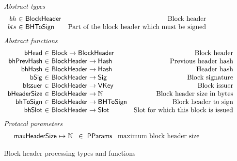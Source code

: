\documentclass[11pt,a4paper]{article}
\newcommand{\fun}[1]{\mathsf{#1}}
\newcommand{\type}[1]{\mathsf{#1}}
\newcommand{\totalf}{\to}
\newcommand{\partialf}{\mapsto}
\newcommand{\Hash}{\type{Hash}}  %
\newcommand{\Slot}{\type{Slot}}
\newcommand{\Block}{\type{Block}}
\newcommand{\VKey}{\type{VKey}}
\newcommand{\Sig}{\type{Sig}}
\newcommand{\ProtParams}{\type{PParams}} %
\newcommand{\bhdrsizename}{bHeaderSize}
\newcommand{\bsigname}{bSig}
\newcommand{\bissuername}{bIssuer}
\begin{document}
\begin{figure}[ht]
  \emph{Abstract types}
  \begin{equation*}
    \begin{array}{r@{~\in~}lr}
      bh & \Bhead & \text{Block header} \\
      bts & \Bhtosign & \text{Part of the block header which must be signed}
    \end{array}
  \end{equation*}
  \emph{Abstract functions}
  \begin{equation*}
    \begin{array}{r@{~\in~}lr}
      \fun{\bheadname} & \Block \totalf \Bhead & \text{Block header} \\
      \fun{\bhprevhashname} & \Bhead \totalf \Hash & \text{Previous header hash} \\
      \fun{\bhhashname} & \Bhead \totalf \Hash & \text{Header hash} \\
      \fun{\bsigname} & \Bhead \totalf \Sig & \text{Block signature} \\
      \fun{\bissuername} & \Bhead \totalf \VKey & \text{Block issuer} \\
      \fun{\bhdrsizename} & \Bhead \totalf \mathbb{N} & \text{Block header size in bytes}\\
      \fun{\bhtosignname} & \Bhead \totalf \Bhtosign & \text{Block header to sign}\\
      \fun{\bhslotname} & \Bhead \totalf \Slot & \text{Slot for which this block is issued}
    \end{array}
  \end{equation*}
  \emph{Protocol parameters}
  \begin{equation*}
    \begin{array}{r@{~\partialf~}l!{~\in~\ProtParams~}r}
      \maxheadersize & \mathbb{N} & \text{maximum block header size} \\
    \end{array}
  \end{equation*}
  \caption{Block header processing types and functions}
  \label{fig:defs:bhead}
\end{figure}
\end{document}
